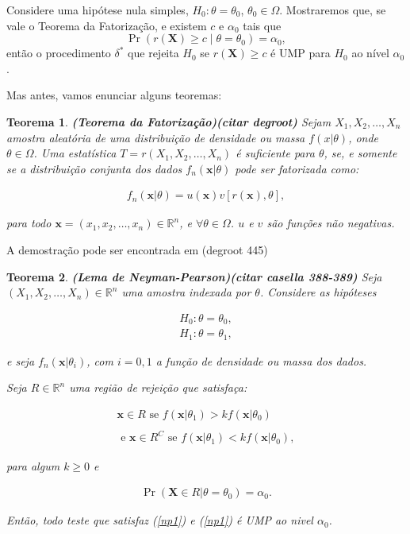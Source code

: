 \documentclass[a4paper,10pt, notitlepage]{report}
\newtheorem{teo}{Teorema}
\newcommand{\gt}{>}%
\newcommand{\pr}{\operatorname{Pr}} %
\newcommand{\rs}{X_1, X_2, \ldots, X_n} %
\newcommand{\rsd}{x_1, x_2, \ldots, x_n} %
\newcommand{\bX}{\boldsymbol{X}} %
\newcommand{\bx}{\boldsymbol{x}} %
\begin{document}
	Considere uma hipótese nula simples, $H_0: \theta = \theta_0$, $\theta_0 \in \Omega$.
	Mostraremos que, se vale o Teorema da Fatorização, e existem $c$ e $\alpha_0$ tais que
	\begin{equation}
	\pr\left(r(\bX) \geq c \mid \theta = \theta_0\right) = \alpha_0\nonumber,
	\end{equation}
	então o procedimento $\delta^\ast$ que rejeita $H_0$ se $r(\bX) \geq c$ é UMP para $H_0$ ao nível $\alpha_0$.
	
	Mas antes, vamos enunciar alguns teoremas:
	
	\begin{teo}
		\textbf{(Teorema da Fatorização)(citar degroot)}
		Sejam $\rs$ amostra aleatória de uma distribuição de densidade ou massa $f(x|\theta)$, onde $\theta\in\Omega$. Uma estatística $T=r(\rs)$ é suficiente para $\theta$, se, e somente se a distribuição conjunta dos dados $f_n(\bx|\theta)$ pode ser fatorizada como:
		
		\begin{align*}
			f_n(\bx|\theta) = u(\bx)v[r(\bx),\theta],
		\end{align*}
		
		para todo $\bx= (\rsd)\in\mathbb{R}^n$, e $\forall \theta \in \Omega$. $u$ e $v$ são funções não negativas.
		
	\end{teo}

	A demostração pode ser encontrada em (degroot 445)
	
	\begin{teo}
		\textbf{(Lema de Neyman-Pearson)(citar casella 388-389)} Seja $(\rs)\in\mathbb{R}^n$ uma amostra indexada por $\theta$. Considere as hipóteses
		
		\begin{align}
		\label{hnp}
		H_0:\theta=\theta_0,\\
		H_1:\theta=\theta_1,\nonumber
		\end{align}
		
		e seja $f_n(\bx|\theta_i)$, com $i=0,1$ a função de densidade ou massa dos dados.
		
		Seja $R\in\mathbb{R}^n$ uma região de rejeição que satisfaça:
		
		\begin{align}
		\label{np1}
			\bx\in R\text{ se } f(\bx|\theta_1)\gt kf(\bx|\theta_0)\nonumber\\ \\\text{ e }\bx\in R^C\text{ se } f(\bx|\theta_1)<k f(\bx|\theta_0),\nonumber
		\end{align}
		
		para algum $k\geq0$ e 
		
		\begin{align}
		\label{np2}
			\pr(\bX\in R|\theta = \theta_0)=\alpha_0.
		\end{align}
		
		Então, todo teste que satisfaz (\ref{np1}) e (\ref{np1}) é UMP ao nivel $\alpha_0$.
	\end{teo}
\end{document}
